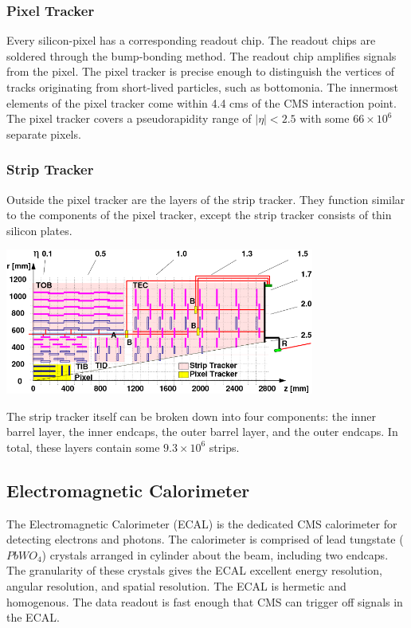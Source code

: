 \subsubsection{Pixel Tracker}

Every silicon-pixel has a corresponding readout chip. The readout chips are soldered through the bump-bonding method. The readout chip amplifies signals from the pixel. The pixel tracker is precise enough to distinguish the vertices of tracks originating from short-lived particles, such as bottomonia. The innermost elements of the pixel tracker come within 4.4 cms of the CMS interaction point. The pixel tracker covers a pseudorapidity range of $|\eta|<2.5$ with some $66 \times 10^6$ separate pixels.

\subsubsection{Strip Tracker}

Outside the pixel tracker are the layers of the strip tracker. They function similar to the components of the pixel tracker, except the strip tracker consists of thin silicon plates. 

\centerline{
\includegraphics[width=4in]{Chapter3/importfigs/cms_cft_09_003_fig1.png}
}

The strip tracker itself can be broken down into four components: the inner barrel layer, the inner endcaps, the outer barrel layer, and the outer endcaps. In total, these layers contain some $9.3 \times 10^6$ strips.

\subsection{Electromagnetic Calorimeter}

The Electromagnetic Calorimeter (ECAL) is the dedicated CMS calorimeter for detecting electrons and photons. The calorimeter is comprised of lead tungstate ($PbWO_4$) crystals arranged in cylinder about the beam, including two endcaps. The granularity of these crystals gives the ECAL excellent energy resolution, angular resolution, and spatial resolution. The ECAL is hermetic and homogenous. The data readout is fast enough that CMS can trigger off signals in the ECAL.

